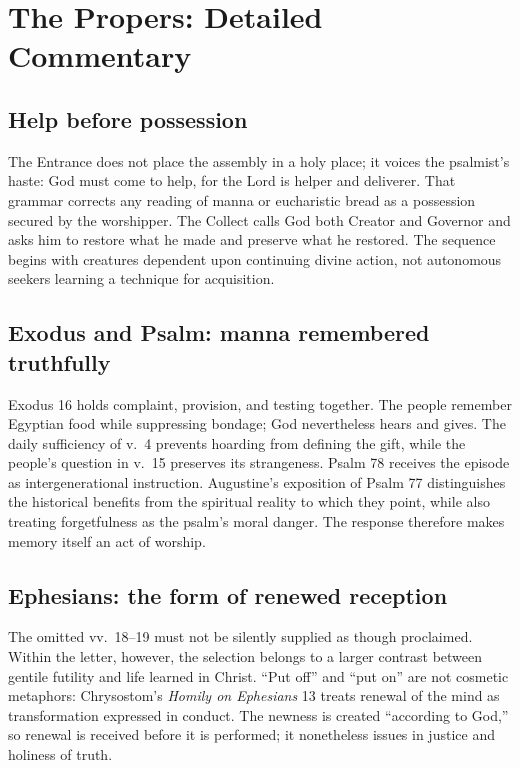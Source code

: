 \section*{The Propers: Detailed Commentary}

\subsection*{Help before possession}

The Entrance does not place the assembly in a holy place; it voices the
psalmist's haste: God must come to help, for the Lord is helper and deliverer.
That grammar corrects any reading of manna or eucharistic bread as a
possession secured by the worshipper. The Collect calls God both Creator and
Governor and asks him to restore what he made and preserve what he restored.
The sequence begins with creatures dependent upon continuing divine action,
not autonomous seekers learning a technique for acquisition.

\subsection*{Exodus and Psalm: manna remembered truthfully}

Exodus 16 holds complaint, provision, and testing together. The people
remember Egyptian food while suppressing bondage; God nevertheless hears and
gives. The daily sufficiency of v.~4 prevents hoarding from defining the gift,
while the people's question in v.~15 preserves its strangeness. Psalm 78
receives the episode as intergenerational instruction. Augustine's exposition
of Psalm 77 distinguishes the historical benefits from the spiritual reality
to which they point, while also treating forgetfulness as the psalm's moral
danger. The response therefore makes memory itself an act of worship.

\subsection*{Ephesians: the form of renewed reception}

The omitted vv.~18--19 must not be silently supplied as though proclaimed.
Within the letter, however, the selection belongs to a larger contrast between
gentile futility and life learned in Christ. ``Put off'' and ``put on'' are
not cosmetic metaphors: Chrysostom's \emph{Homily on Ephesians} 13 treats
renewal of the mind as transformation expressed in conduct. The newness is
created ``according to God,'' so renewal is received before it is performed;
it nonetheless issues in justice and holiness of truth.

